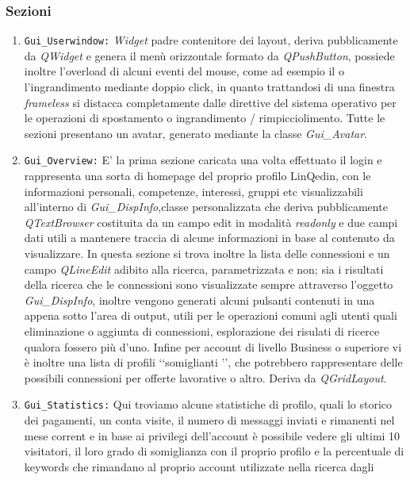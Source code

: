 \subsubsection*{Sezioni}
\begin{enumerate}
    \item
    \texttt{Gui\_Userwindow:} \textit{Widget} padre contenitore dei layout, deriva pubblicamente da \textit{QWidget} e genera il menù orizzontale
    formato da \textit{QPushButton}, possiede inoltre l'overload di alcuni eventi del mouse, come ad esempio il  o l'ingrandimento
    mediante doppio click, in quanto trattandosi di una finestra \textit{frameless} si distacca completamente dalle direttive del sistema operativo
    per le operazioni di spostamento o ingrandimento / rimpicciolimento. Tutte le sezioni presentano un avatar, generato mediante la classe \textit{Gui\_Avatar}.
    \item
    \texttt{Gui\_Overview:} E' la prima sezione caricata una volta effettuato il login e rappresenta una sorta di homepage del proprio profilo LinQedin,
    con le informazioni personali, competenze, interessi, gruppi etc  visualizzabili all'interno di \textit{Gui\_DispInfo},classe personalizzata
    che deriva pubblicamente \textit{QTextBrowser} costituita da un campo edit in modalità \textit{readonly} e due campi dati  utili a
    mantenere traccia di alcune informazioni in base al contenuto da visualizzare.
    In questa sezione si trova inoltre la lista delle connessioni e un campo \textit{QLineEdit} adibito alla ricerca, parametrizzata e non; sia i risultati della ricerca
    che le connessioni sono visualizzate sempre attraverso l'oggetto \textit{Gui\_DispInfo}, inoltre vengono generati alcuni pulsanti contenuti in una 
    appena sotto l'area di output, utili per le operazioni comuni agli utenti quali eliminazione o aggiunta di connessioni, esplorazione dei risulati di ricerce
    qualora fossero più d'uno. Infine per account di livello Business o superiore vi è inoltre una lista di profili \lq\lq somiglianti \rq\rq, che potrebbero rappresentare
    delle possibili connessioni per offerte lavorative o altro. Deriva da \textit{QGridLayout}.
    \item
    \texttt{Gui\_Statistics:} Qui troviamo alcune statistiche di profilo, quali lo storico dei pagamenti, un conta visite, il numero di messaggi inviati e rimanenti nel mese corrent e in base ai privilegi
    dell'account è possibile vedere gli ultimi 10 visitatori, il loro grado di somiglianza con il proprio profilo e la percentuale di keywords che rimandano al proprio account utilizzate nella ricerca dagli

\end{enumerate}
